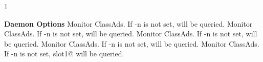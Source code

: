 \begin{ManPage}{\label{man-condor-top}}{1}
\begin{Options}
    \textbf{Daemon Options}
            {Monitor  ClassAds. If -n is not set,
               will be queried.}
            {Monitor  ClassAds. If -n is not set,
               will be queried.}
            {Monitor  ClassAds. If -n is not set,
               will be queried.}
            {Monitor  ClassAds. If -n is not set,
               will be queried.}
            {Monitor  ClassAds. If -n is not set,
              slot1@ will be queried.}

\end{Options}

\end{ManPage}
